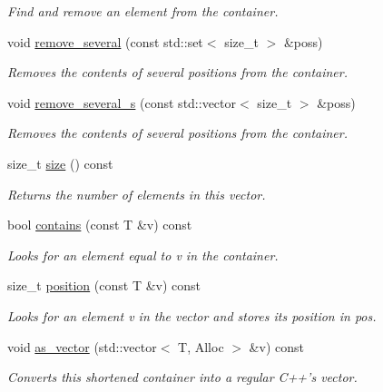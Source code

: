 \begin{DoxyCompactItemize}
\begin{DoxyCompactList}\small\item\em Find and remove an element from the container. \end{DoxyCompactList}\item 
void \hyperlink{classlgraph_1_1utils_1_1svector_a59ff2525161af10a94a64a0be8204556}{remove\-\_\-several} (const std\-::set$<$ size\-\_\-t $>$ \&poss)
\begin{DoxyCompactList}\small\item\em Removes the contents of several positions from the container. \end{DoxyCompactList}\item 
void \hyperlink{classlgraph_1_1utils_1_1svector_a2b3c8a4fcd5234fbe2e05bb36d406b01}{remove\-\_\-several\-\_\-s} (const std\-::vector$<$ size\-\_\-t $>$ \&poss)
\begin{DoxyCompactList}\small\item\em Removes the contents of several positions from the container. \end{DoxyCompactList}\item 
size\-\_\-t \hyperlink{classlgraph_1_1utils_1_1svector_afa5c1579ffdd022698756ba4c142dd86}{size} () const 
\begin{DoxyCompactList}\small\item\em Returns the number of elements in this vector. \end{DoxyCompactList}\item 
bool \hyperlink{classlgraph_1_1utils_1_1svector_ab17c14abafd02d01a0e1f8230ed23680}{contains} (const T \&v) const 
\begin{DoxyCompactList}\small\item\em Looks for an element equal to {\itshape v} in the container. \end{DoxyCompactList}\item 
size\-\_\-t \hyperlink{classlgraph_1_1utils_1_1svector_ac71629dfb853c4e85a0a7f4b20f821d9}{position} (const T \&v) const 
\begin{DoxyCompactList}\small\item\em Looks for an element {\itshape v} in the vector and stores its position in {\itshape pos}. \end{DoxyCompactList}\item 
void \hyperlink{classlgraph_1_1utils_1_1svector_a150e04d045dc41f0c40398718f06106c}{as\-\_\-vector} (std\-::vector$<$ T, Alloc $>$ \&v) const 
\begin{DoxyCompactList}\small\item\em Converts this shortened container into a regular C++'s vector. \end{DoxyCompactList}\end{DoxyCompactItemize}
